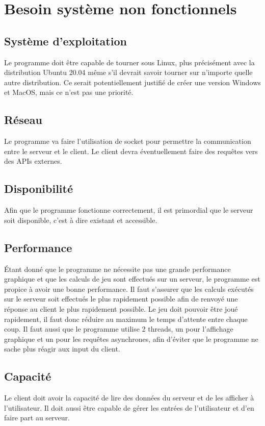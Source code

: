 \section{Besoin système non fonctionnels}
\subsection{Système d'exploitation}
Le programme doit être capable de tourner sous Linux, plus précisément avec la distribution Ubuntu 20.04 même s'il devrait savoir tourner
sur n'importe quelle autre distribution.
Ce serait potentiellement justifié de créer une version Windows et MacOS, mais ce n'est pas une priorité.

\subsection{Réseau}
Le programme va faire l'utilisation de socket pour permettre la communication entre le serveur et le client. 
Le client devra éventuellement faire des requêtes vers des APIs externes.

\subsection{Disponibilité}
Afin que le programme fonctionne correctement, il est primordial que le serveur soit disponible, c'est à dire existant et accessible. 

\subsection{Performance}
Étant donné que le programme ne nécessite pas une grande performance graphique et que les calculs de jeu sont effectués sur un serveur, le
programme est propice à avoir une bonne performance. Il faut s'assurer que les calculs exécutés sur le serveur soit effectués le plus
rapidement possible afin de renvoyé une réponse au client le plus rapidement possible. Le jeu doit pouvoir être joué rapidement, il faut
donc réduire au maximum le temps d'attente entre chaque coup.
Il faut aussi que le programme utilise 2 threads, un pour l'affichage graphique et un pour les requêtes asynchrones, afin d'éviter que le
programme ne sache plus réagir aux input du client.

\subsection{Capacité}
Le client doit avoir la capacité de lire des données du serveur et de les afficher à l'utilisateur. Il doit aussi être capable de gérer les
entrées de l'utilisateur et d'en faire part au serveur.

